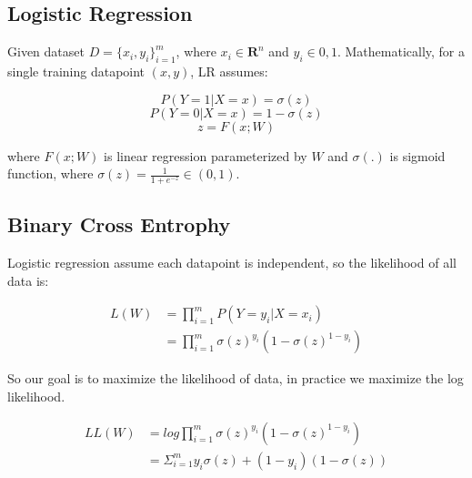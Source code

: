 \documentclass[journal, a4paper]{IEEEtran}
\begin{document}
\subsection{Logistic Regression}
Given dataset $ D=\{x_{i}, y_{i}\}_{i=1}^{m}$, where $x_{i} \in \mathbf{R}^{n}$ and $y_{i} \in {0, 1}$. Mathematically, for a single training datapoint $(x, y)$, LR assumes: \par
 \begin{center}
	\begin{equation}
	P(Y = 1|X = x) = \sigma(z) 
	\end{equation}
	\begin{equation}
	P(Y = 0|X = x) = 1 - \sigma(z)
	\end{equation}
	\begin{equation}
	z = F(x; W)
	\end{equation}
\end{center} \par
where $F(x; W)$ is linear regression parameterized by $W$ and $\sigma(.)$ is sigmoid function, where $\sigma(z) = \frac{1}{1 + e^{-z}} \in (0, 1)$.
\subsection{Binary Cross Entrophy}
Logistic regression assume each datapoint is independent, so the likelihood of all data is: \par
\begin{equation}
	\begin{aligned}
	L(W) &= \prod_{i=1}^m P(Y = y_i | X = x_i) \\ &= \prod_{i=1}^m \sigma(z)^{y_i} (1 - \sigma(z)^{1 - y_i} )
	\end{aligned}
\end{equation} \par

So our goal is to maximize the likelihood of data, in practice we maximize the log likelihood. \par
\begin{equation}
\begin{aligned}
LL(W) &= log\prod_{i=1}^m \sigma(z)^{y_i} (1 - \sigma(z)^{1 - y_i} ) \\ &= \Sigma_{i=1}^{m} y_i \sigma(z) + (1 - y_i)(1 - \sigma(z))
\end{aligned}
\end{equation} \par
\end{document}
